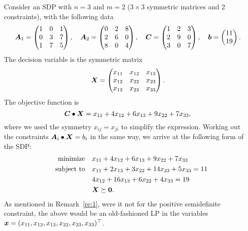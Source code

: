 \begin{example}\label{ex:17-1}
Consider an SDP with $n=3$ and $m=2$ ($3\times 3$ symmetric matrices and $2$ constraints), with the following data
\begin{equation*}
 \bm{A}_1 = \begin{pmatrix}
              1 & 0 & 1\\
              0 & 3 & 7\\
              1 & 7 & 5
             \end{pmatrix}, \quad
\bm{A}_2 = \begin{pmatrix}
             0 & 2 & 8\\
             2 & 6 & 0\\
             8 & 0 & 4
            \end{pmatrix}, \quad
\bm{C} = \begin{pmatrix}
           1 & 2 & 3\\
           2 & 9 & 0\\
           3 & 0 & 7 
          \end{pmatrix}, \quad
\bm{b} = \begin{pmatrix} 
           11 \\ 19
          \end{pmatrix}.
\end{equation*}
The decision variable is the symmetric matrix
\begin{equation*}
 \bm{X} = \begin{pmatrix}
            x_{11} & x_{12} & x_{13}\\
            x_{12} & x_{22} & x_{23}\\
            x_{13} & x_{23} & x_{33}
           \end{pmatrix}.
\end{equation*}
The objective function is
\begin{equation*}
 \bm{C}\bullet \bm{X} = x_{11}+4x_{12}+6x_{13}+9x_{22}+7x_{33},
\end{equation*}
where we used the symmetry $x_{ij}=x_{ji}$ to simplify the expression. Working out the constraints $\bm{A}_i\bullet \bm{X}=b_i$ in the same way, we arrive at the following form of the SDP:
\begin{align*}
 \text{minimize}\quad & x_{11}+4x_{12}+6x_{13}+9x_{22}+7x_{33}\\
 \quad\text{subject to}\quad & x_{11}+2x_{13}+3x_{22}+14x_{23}+5x_{33} = 11\\
 & 4x_{12}+16x_{13}+6x_{22}+4x_{33} = 19\\
 & \bm{X}\succeq \bm{0}.
\end{align*}
As mentioned in Remark~\ref{re:1}, were it not for the positive semidefinite constraint, the above would be an old-fashioned LP in the variables $\bm{x}=(x_{11},x_{12},x_{13},x_{22},x_{23},x_{33})^{\top}$.
\end{example}


